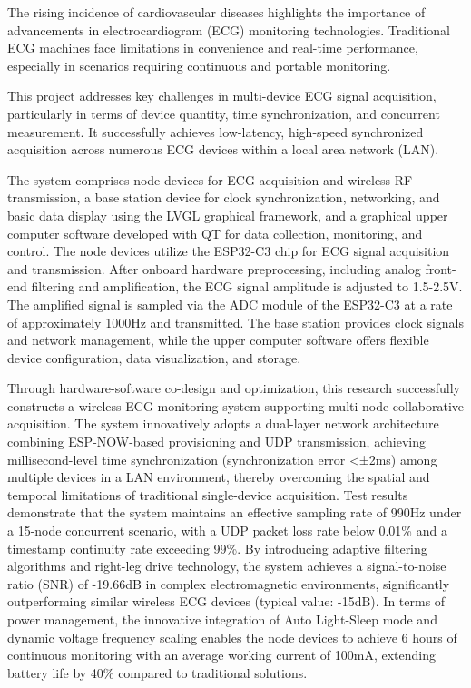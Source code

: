 {}

\begin{abstracten}
    The rising incidence of cardiovascular diseases highlights the importance of advancements in electrocardiogram (ECG) monitoring technologies. Traditional ECG machines face limitations in convenience and real-time performance, especially in scenarios requiring continuous and portable monitoring.

    This project addresses key challenges in multi-device ECG signal acquisition, particularly in terms of device quantity, time synchronization, and concurrent measurement. It successfully achieves low-latency, high-speed synchronized acquisition across numerous ECG devices within a local area network (LAN).
    
    The system comprises node devices for ECG acquisition and wireless RF transmission, a base station device for clock synchronization, networking, and basic data display using the LVGL graphical framework, and a graphical upper computer software developed with QT for data collection, monitoring, and control. The node devices utilize the ESP32-C3 chip for ECG signal acquisition and transmission. After onboard hardware preprocessing, including analog front-end filtering and amplification, the ECG signal amplitude is adjusted to 1.5-2.5V. The amplified signal is sampled via the ADC module of the ESP32-C3 at a rate of approximately 1000Hz and transmitted. The base station provides clock signals and network management, while the upper computer software offers flexible device configuration, data visualization, and storage.
    
    Through hardware-software co-design and optimization, this research successfully constructs a wireless ECG monitoring system supporting multi-node collaborative acquisition. The system innovatively adopts a dual-layer network architecture combining ESP-NOW-based provisioning and UDP transmission, achieving millisecond-level time synchronization (synchronization error <±2ms) among multiple devices in a LAN environment, thereby overcoming the spatial and temporal limitations of traditional single-device acquisition. Test results demonstrate that the system maintains an effective sampling rate of 990Hz under a 15-node concurrent scenario, with a UDP packet loss rate below 0.01\% and a timestamp continuity rate exceeding 99\%. By introducing adaptive filtering algorithms and right-leg drive technology, the system achieves a signal-to-noise ratio (SNR) of -19.66dB in complex electromagnetic environments, significantly outperforming similar wireless ECG devices (typical value: -15dB). In terms of power management, the innovative integration of Auto Light-Sleep mode and dynamic voltage frequency scaling enables the node devices to achieve 6 hours of continuous monitoring with an average working current of 100mA, extending battery life by 40\% compared to traditional solutions.
    

\end{abstracten}
